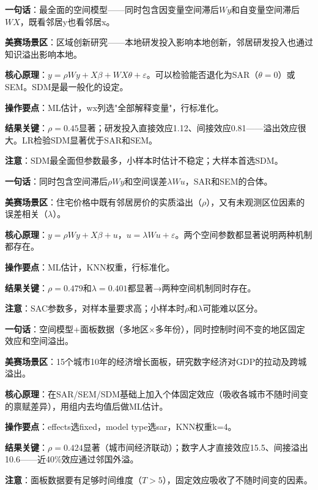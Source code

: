 \begin{algobrief}
\textbf{一句话}：最全面的空间模型——同时包含因变量空间滞后$Wy$和自变量空间滞后$WX$，既看邻居y也看邻居x。

\textbf{美赛场景区}：区域创新研究——本地研发投入影响本地创新，邻居研发投入也通过知识溢出影响本地。

\textbf{核心原理}：$y=\rho Wy+X\beta+WX\theta+\varepsilon$。可以检验能否退化为SAR（$\theta=0$）或SEM。SDM是最一般化的设定。

\textbf{操作要点}：ML估计，wx列选"全部解释变量"，行标准化。

\textbf{结果关键}：$\rho=0.45$显著；研发投入直接效应1.12、间接效应0.81——溢出效应很大。LR检验SDM显著优于SAR和SEM。

\textbf{注意}：SDM最全面但参数最多，小样本时估计不稳定；大样本首选SDM。
\end{algobrief}


\begin{algobrief}
\textbf{一句话}：同时包含空间滞后$\rho Wy$和空间误差$\lambda Wu$，SAR和SEM的合体。

\textbf{美赛场景区}：住宅价格中既有邻居房价的实质溢出（$\rho$），又有未观测区位因素的误差相关（$\lambda$）。

\textbf{核心原理}：$y=\rho Wy+X\beta+u$，$u=\lambda Wu+\varepsilon$。两个空间参数都显著说明两种机制都存在。

\textbf{操作要点}：ML估计，KNN权重，行标准化。

\textbf{结果关键}：$\rho=0.479$和$\lambda=0.401$都显著→两种空间机制同时存在。

\textbf{注意}：SAC参数多，对样本量要求高；小样本时$\rho$和$\lambda$可能难以区分。
\end{algobrief}


\begin{algobrief}
\textbf{一句话}：空间模型+面板数据（多地区×多年份），同时控制时间不变的地区固定效应和空间溢出。

\textbf{美赛场景区}：15个城市10年的经济增长面板，研究数字经济对GDP的拉动及跨城溢出。

\textbf{核心原理}：在SAR/SEM/SDM基础上加入个体固定效应（吸收各城市不随时间变的禀赋差异），用组内去均值后做ML估计。

\textbf{操作要点}：effects选fixed，model type选sar，KNN权重k=4。

\textbf{结果关键}：$\rho=0.424$显著（城市间经济联动）；数字人才直接效应15.5、间接溢出10.6——近40\%效应通过邻国外溢。

\textbf{注意}：面板数据要有足够时间维度（$T>5$），固定效应吸收了不随时间变的因素。
\end{algobrief}

